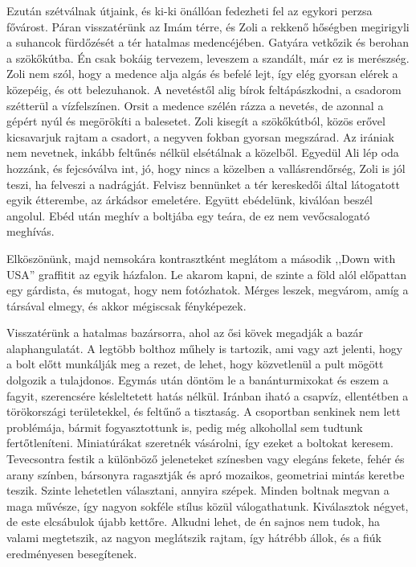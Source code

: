 Ezután szétválnak útjaink, és ki-ki önállóan fedezheti fel az egykori
perzsa fővárost. Páran visszatérünk az Imám térre, és Zoli a rekkenő
hőségben megirigyli a suhancok fürdőzését a tér hatalmas medencéjében.
Gatyára vetkőzik és berohan a szökőkútba. Én csak bokáig tervezem,
leveszem a szandált, már ez is merészség. Zoli nem szól, hogy
a medence alja algás és befelé lejt, így elég gyorsan elérek a közepéig,
és ott belezuhanok. A nevetéstől alig bírok feltápászkodni, a csadorom
szétterül a vízfelszínen. Orsit a medence szélén rázza a nevetés, de
azonnal a gépért nyúl és megörökíti a balesetet. Zoli kisegít a szökőkútból,
közös erővel kicsavarjuk rajtam a csadort, a negyven fokban
gyorsan megszárad. Az irániak nem nevetnek, inkább feltűnés nélkül
elsétálnak a közelből. Egyedül Ali lép oda hozzánk, és fejcsóválva int,
jó, hogy nincs a közelben a vallásrendőrség, Zoli is jól teszi, ha felveszi
a nadrágját. Felvisz bennünket a tér kereskedői által látogatott egyik
étterembe, az árkádsor emeletére. Együtt ebédelünk, kiválóan beszél
angolul. Ebéd után meghív a boltjába egy teára, de ez nem vevőcsalogató
meghívás.

Elköszönünk, majd nemsokára kontrasztként meglátom a második
,,Down with USA'' graffitit az egyik házfalon. Le akarom kapni,
de szinte a föld alól előpattan egy gárdista, és mutogat, hogy nem
fotózhatok. Mérges leszek, megvárom, amíg a társával elmegy, és akkor
mégiscsak fényképezek.

Visszatérünk a hatalmas bazársorra, ahol az ősi kövek megadják a
bazár alaphangulatát. A legtöbb bolthoz műhely is tartozik, ami vagy
azt jelenti, hogy a bolt előtt munkálják meg a rezet, de lehet, hogy
közvetlenül a pult mögött dolgozik a tulajdonos. Egymás után döntöm
le a banánturmixokat és eszem a fagyit, szerencsére késleltetett hatás
nélkül. Iránban iható a csapvíz, ellentétben a törökországi területekkel,
és feltűnő a tisztaság. A csoportban senkinek nem lett problémája,
bármit fogyasztottunk is, pedig még alkohollal sem tudtunk
fertőtleníteni. Miniatúrákat szeretnék vásárolni, így ezeket a boltokat
keresem. Tevecsontra festik a különböző jeleneteket színesben vagy
elegáns fekete, fehér és arany színben, bársonyra ragasztják és apró
mozaikos, geometriai mintás keretbe teszik. Szinte lehetetlen választani,
annyira szépek. Minden boltnak megvan a maga művésze, így
nagyon sokféle stílus közül válogathatunk. Kiválasztok négyet, de este
elcsábulok újabb kettőre. Alkudni lehet, de én sajnos nem tudok, ha
valami megtetszik, az nagyon meglátszik rajtam, így hátrébb állok, és
a fiúk eredményesen besegítenek.

